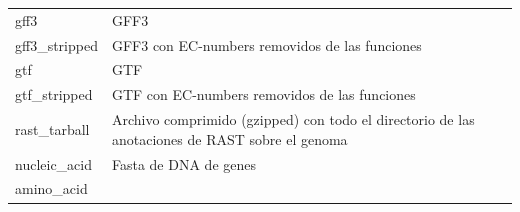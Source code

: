 \documentclass[12pt,twoside]{reedthesis}
\begin{document}
\begin{longtable}[]{@{}ll@{}}
  \begin{minipage}[t]{0.22\columnwidth}\raggedright\strut
  gff3\strut
  \end{minipage} & \begin{minipage}[t]{0.72\columnwidth}\raggedright\strut
  GFF3\strut
  \end{minipage}\tabularnewline
  \begin{minipage}[t]{0.22\columnwidth}\raggedright\strut
  gff3\_stripped\strut
  \end{minipage} & \begin{minipage}[t]{0.72\columnwidth}\raggedright\strut
  GFF3 con EC-numbers removidos de las funciones\strut
  \end{minipage}\tabularnewline
  \begin{minipage}[t]{0.22\columnwidth}\raggedright\strut
  gtf\strut
  \end{minipage} & \begin{minipage}[t]{0.72\columnwidth}\raggedright\strut
  GTF\strut
  \end{minipage}\tabularnewline
  \begin{minipage}[t]{0.22\columnwidth}\raggedright\strut
  gtf\_stripped\strut
  \end{minipage} & \begin{minipage}[t]{0.72\columnwidth}\raggedright\strut
  GTF con EC-numbers removidos de las funciones\strut
  \end{minipage}\tabularnewline
  \begin{minipage}[t]{0.22\columnwidth}\raggedright\strut
  rast\_tarball\strut
  \end{minipage} & \begin{minipage}[t]{0.72\columnwidth}\raggedright\strut
  Archivo comprimido (gzipped) con todo el directorio de las anotaciones
  de RAST sobre el genoma\strut
  \end{minipage}\tabularnewline
  \begin{minipage}[t]{0.22\columnwidth}\raggedright\strut
  nucleic\_acid\strut
  \end{minipage} & \begin{minipage}[t]{0.72\columnwidth}\raggedright\strut
  Fasta de DNA de genes\strut
  \end{minipage}\tabularnewline
  \begin{minipage}[t]{0.22\columnwidth}\raggedright\strut
  amino\_acid\strut
  \end{minipage} & \begin{minipage}[t]{0.72\columnwidth}\raggedright\strut

\end{minipage}
\end{longtable}
\end{document}
